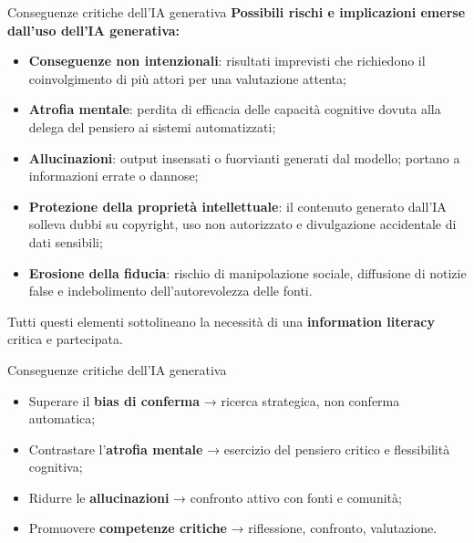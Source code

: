 \documentclass{beamer}
\begin{document}
\begin{frame}{Conseguenze critiche dell'IA generativa}
\small
\textbf{Possibili rischi e implicazioni emerse dall’uso dell’IA generativa:}

\vspace{0.3cm}
\begin{itemize}
    \item \textbf{Conseguenze non intenzionali}: risultati imprevisti che richiedono il coinvolgimento di più attori per una valutazione attenta;
    
    \item \textbf{Atrofia mentale}: perdita di efficacia delle capacità cognitive dovuta alla delega del pensiero ai sistemi automatizzati;

    \item \textbf{Allucinazioni}: output insensati o fuorvianti generati dal modello; portano a informazioni errate o dannose;

    \item \textbf{Protezione della proprietà intellettuale}: il contenuto generato dall’IA solleva dubbi su copyright, uso non autorizzato e divulgazione accidentale di dati sensibili;

    \item \textbf{Erosione della fiducia}: rischio di manipolazione sociale, diffusione di notizie false e indebolimento dell'autorevolezza delle fonti.
\end{itemize}

\vspace{0.2cm}
Tutti questi elementi sottolineano la necessità di una \textbf{information literacy} critica e partecipata.
\end{frame}
%
%
\begin{frame}{Conseguenze critiche dell'IA generativa}

\vspace{0.3cm}
\begin{itemize}
    \item Superare il \textbf{bias di conferma} → ricerca strategica, non conferma automatica;
    \item Contrastare l’\textbf{atrofia mentale} → esercizio del pensiero critico e flessibilità cognitiva;
    \item Ridurre le \textbf{allucinazioni} → confronto attivo con fonti e comunità;
    \item Promuovere \textbf{competenze critiche} → riflessione, confronto, valutazione.
\end{itemize}

\end{frame}
\end{document}
